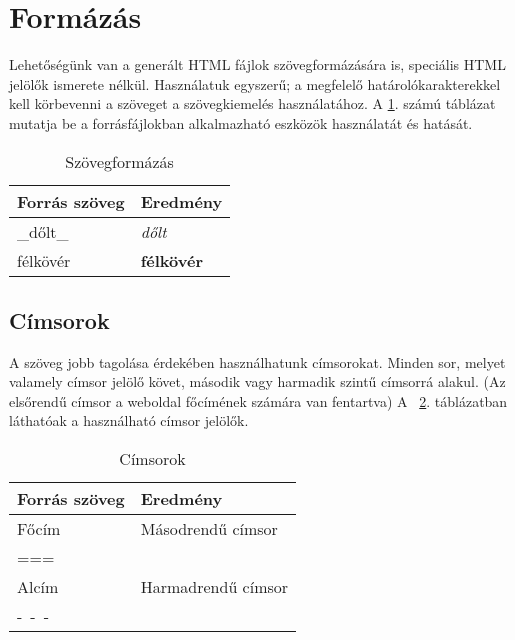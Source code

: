 \documentclass[a4paper,10pt]{article}
\begin{document}
\section{Formázás}
\label{sec:format}
Lehetőségünk van a generált HTML fájlok szövegformázására is, speciális HTML jelölők ismerete nélkül. Használatuk egyszerű; a megfelelő határolókarakterekkel kell körbevenni a szöveget a szövegkiemelés használatához. A \ref{table:textformat}. számú táblázat mutatja be a forrásfájlokban alkalmazható eszközök használatát és hatását.

\begin{table}[h!]
  \begin{center}
    \begin{tabular}{| l | l |}
    \hline
    Forrás szöveg & Eredmény \\
    \hline \hline
    \_dőlt\_ & \textit{dőlt} \\
    \hline
    \*félkövér\* & \textbf{félkövér} \\
    \hline
    \end{tabular}
  \end{center}
  \caption{Szövegformázás}
  \label{table:textformat}
\end{table}

\subsection{Címsorok}
A szöveg jobb tagolása érdekében használhatunk címsorokat. Minden sor, melyet valamely címsor jelölő követ, második vagy harmadik szintű címsorrá alakul. (Az elsőrendű címsor a weboldal főcímének számára van fentartva) A ~\ref{table:headerformat}. táblázatban láthatóak a használható címsor jelölők.

\begin{table}[h!]
  \begin{center}
    \begin{tabular}{| l | l |}
    \hline
    Forrás szöveg & Eredmény \\
    \hline \hline
    Főcím & Másodrendű címsor \\
    === & ~ \\
    \hline
    Alcím & Harmadrendű címsor \\
    -~-~- & ~ \\
    \hline
    \end{tabular}
  \end{center}
  \caption{Címsorok}
  \label{table:headerformat}
\end{table}
\end{document}
